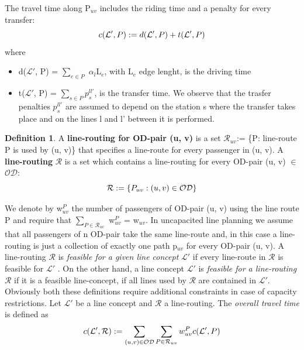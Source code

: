 \documentclass[
  twoside,
  12pt, a4paper,
  footinclude=true,
  headinclude=true,
  cleardoublepage=empty
]{scrbook}
\theoremstyle{definition}
\newtheorem{definition}[theorem]{Definition}
\begin{document}
The travel time along P$_{uv}$ includes the riding time and a penalty for every transfer:
\begin{equation} \notag
c(\mathcal{L'}, P) := d(\mathcal{L'}, P) + t(\mathcal{L'}, P)
\end{equation}
where
\begin{itemize}
\item d($\mathcal{L'}$, P) = $\sum_{e \in P}$ $\alpha_l$L$_e$, with L$_e$ edge lenght, is the driving time
\item t($\mathcal{L'}$, P) =  $\sum_{s \in P} p^{ll'}_s$, is the transfer time. We observe that the trasfer penalties $p^{ll'}_s$ are assumed to depend on the station s where the transfer takes place and on the lines l and l' between it is performed.
\end{itemize}
\begin{definition} A \textbf{line-routing for OD-pair (u, v)} is a set $\mathcal{R}_{uv}$:= \{P: line-route P is used by (u, v)\} that specifies a line-route for every passenger in (u, v). \newline
A \textbf{line-routing} $\mathcal{R}$ is a set which contains a line-routing for every OD-pair (u, v) $\in$ $\mathcal{OD}$:
\begin{equation} \notag
\mathcal{R} := \{P_{uv} : (u, v) \in \mathcal{OD}\}
\end{equation}
\end{definition}
We denote by w$^P_{uv}$ the number of passengers of OD-pair (u, v) using the line route P and require that $\sum_{P \in \mathcal{R}_{uv}}$ w$^P_{uv}$ = w$_{uv}$. In uncapacited line planning we assume that all passengers of n OD-pair take the same line-route and, in this case a line-routing is just a collection of exactly one path p$_{uv}$ for every OD-pair (u, v). \newline
A line-routing $\mathcal{R}$ is \emph{feasible for a given line concept} $\mathcal{L'}$ if every line-route in $\mathcal{R}$ is feasible for $\mathcal{L'}$ . \newline
On the other hand, a line concept $\mathcal{L'}$ is \emph{feasible for a line-routing} $\mathcal{R}$ if it is a feasible line-concept, if all lines used by $\mathcal{R}$ are contained in $\mathcal{L'}$. \newline
Obviously both these definitions require additional constraints in case of capacity restrictions. \newline
Let $\mathcal{L'}$ be a line concept and $\mathcal{R}$ a line-routing. The \emph{overall travel time} is defined as
\begin{equation} \notag
c(\mathcal{L'}, \mathcal{R}) := \sum_{(u, v) \in \mathcal{OD}} \sum_{P \in \mathcal{R}_{uv}} w^P_{uv}c(\mathcal{L'}, P)
\end{equation} 
\end{document}
